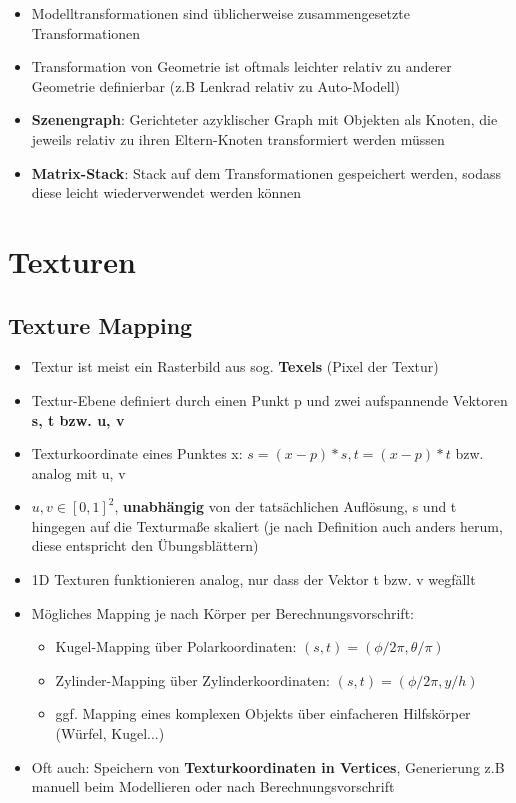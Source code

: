 \documentclass[10pt,a4paper]{article}
\begin{document}
	\begin{itemize}
		\item Modelltransformationen sind üblicherweise zusammengesetzte Transformationen
		\item Transformation von Geometrie ist oftmals leichter relativ zu anderer Geometrie definierbar (z.B Lenkrad relativ zu Auto-Modell)
		\item \textbf{Szenengraph}: Gerichteter azyklischer Graph mit Objekten als Knoten, die jeweils relativ zu ihren Eltern-Knoten transformiert werden müssen
		\item \textbf{Matrix-Stack}: Stack auf dem Transformationen gespeichert werden, sodass diese leicht wiederverwendet werden können
	\end{itemize}

	\newpage
	\section{Texturen}
	\label{sec:texturen}

	\subsection{Texture Mapping}
	\label{sub:texture_mapping}
	
	\begin{itemize}
		\item Textur ist meist ein Rasterbild aus sog. \textbf{Texels} (Pixel der Textur)
		\item Textur-Ebene definiert durch einen Punkt p und zwei aufspannende Vektoren \textbf{s, t bzw. u, v}
		\item Texturkoordinate eines Punktes x: $s = (x - p) * s, t = (x - p) * t$ bzw. analog mit u, v
		\item $u, v \in [0, 1]^2$, \textbf{unabhängig} von der tatsächlichen Auflösung, s und t hingegen auf die Texturmaße skaliert (je nach Definition auch anders herum, diese entspricht den Übungsblättern)
		\item 1D Texturen funktionieren analog, nur dass der Vektor t bzw. v wegfällt
		\item Mögliches Mapping je nach Körper per Berechnungsvorschrift:
		\begin{itemize}
			\item Kugel-Mapping über Polarkoordinaten: $(s, t) = (\phi / 2 \pi, \theta / \pi)$
			\item Zylinder-Mapping über Zylinderkoordinaten: $(s, t) = (\phi / 2 \pi, y / h)$
			\item ggf. Mapping eines komplexen Objekts über einfacheren Hilfskörper (Würfel, Kugel...)
		\end{itemize}
		\item Oft auch: Speichern von \textbf{Texturkoordinaten in Vertices}, Generierung z.B manuell beim Modellieren oder nach Berechnungsvorschrift
	\end{itemize}
	
\end{document}
